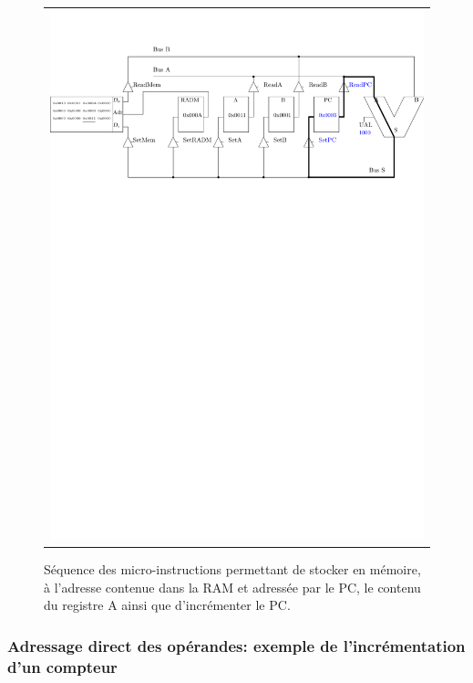 \begin{figure}[htbp]
\begin{tabular}{c}
\includegraphics[width=\linewidth]{Figs/premier_chemin_sta4.pdf}
\end{tabular}
\caption{\label{fig:premier_chemin_sta} Séquence des micro-instructions permettant de stocker en mémoire, à l'adresse contenue dans la RAM et adressée par le PC, le contenu du registre A ainsi que d'incrémenter le PC.}
\end{figure}


\pagebreak

\subsubsection{Adressage direct des opérandes: exemple de l'incrémentation d'un compteur}

